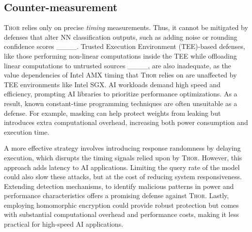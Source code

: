 \subsection{Counter-measurement}
\begin{comment}
\textsc{Thor} relies only on precise \textit{timing} measurements. Therefore, it cannot be mitigated by defenses that alter the classification output of NNs, such as adding noise or rounding confidence scores ____. 
Trusted Execution Environment (TEE)-based defenses, such as those performing non-linear computations inside the TEE while offloading linear computations to untrusted sources ____, are also inadequate since we confirmed that the value dependencies of Intel AMX timing that \textsc{Thor} relies on are unaffected by TEE environments like Intel SGX. 
AI workloads demand high speed and efficiency, prompting AI libraries to prioritize performance optimizations. As a result, known constant-time programming techniques are often unsuitable as a defense. For example, masking can help protect weights from leaking but introduces extra computational overhead, increasing both power consumption and execution time.
\end{comment}
\textsc{Thor} relies only on precise \textit{timing} measurements. Thus, it cannot be mitigated by defenses that alter NN classification outputs, such as adding noise or rounding confidence scores ____. Trusted Execution Environment (TEE)-based defenses, like those performing non-linear computations inside the TEE while offloading linear computations to untrusted sources ____, are also inadequate, as the value dependencies of Intel AMX timing that \textsc{Thor} relies on are unaffected by TEE environments like Intel SGX. AI workloads demand high speed and efficiency, prompting AI libraries to prioritize performance optimizations. As a result, known constant-time programming techniques are often unsuitable as a defense. For example, masking can help protect weights from leaking but introduces extra computational overhead, increasing both power consumption and execution time.

A more effective strategy involves introducing response randomness by delaying execution, which disrupts the timing signals relied upon by \textsc{Thor}. However, this approach adds latency to AI applications. Limiting the query rate of the model 
could also slow these attacks, but at the cost of reducing system responsiveness.
Extending detection mechanisms, 
to identify malicious patterns in power and performance characteristics offers a promising defense against \textsc{Thor}.
Lastly, employing homomorphic encryption 
could provide robust protection but comes with substantial computational overhead and performance costs, making it less practical for high-speed AI applications.


